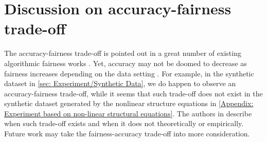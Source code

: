\documentclass{article}
\begin{document}
\section{Discussion on accuracy-fairness trade-off} \label{Appendix: Discussion on Accuracy-fairness trade-off}

The accuracy-fairness trade-off is pointed out in a great number of existing algorithmic fairness works \citep{martinez2019fairness, zhao2019inherent, menon2018cost, zliobaite2015relation, chen2018my, wei2022}. Yet, accuracy may not be doomed to decrease as fairness increases depending on the data setting \citep{dutta2020there,  friedler2021possibility, Yeom2018DiscriminativeBN}. For example, in the synthetic dataset in \cref{sec: Experiment/Synthetic Data}, we do happen to observe an accuracy-fairness trade-off, while it seems that such trade-off does not exist in the synthetic dataset generated by the nonlinear structure equations in \cref{Appendix: Experiment based on non-linear structural equations}. The authors in \citep{wick2019unlocking, inproceedings, dutta2020there} describe when such trade-off exists and when it does not theoretically or empirically. 
Future work may take the fairness-accuracy trade-off into more consideration. %
\end{document}
